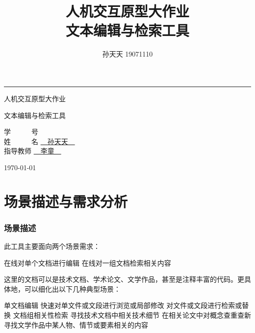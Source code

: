 \documentclass[scheme = chinese]{ctexart}
\begin{document}
\begin{titlepage}
    \centering
    \rule{\textwidth}{0pt}
    \vspace{0.25\textheight}
    
    { \heiti\sffamily 人机交互原型大作业}
    
    \vspace{0.05\textheight}
    
    { \heiti\sffamily 文本编辑与检索工具}
    
    \vspace{0.25\textheight}
    {
        \selectfont \songti
        学~~~~~~号 \underline{\qquad{}\;\qquad} \\
        姓~~~~~~名 \underline{\qquad~~孙天天~~\qquad} \\ 
        指导教师   \underline{\qquad~~李\quad 童~~\qquad} \\
    }
    \vspace{0.05\textheight}
    
    {\fontsize{10.5pt}{10.5pt}\selectfont \songti \today}
    
    \vfill
\end{titlepage}

\title{\huge 人机交互原型大作业\\
    \Large 文本编辑与检索工具}
\author{孙天天 19071110}

\tableofcontents
\clearpage

\maketitle

\part{场景描述与需求分析}

\section{场景描述}
此工具主要面向两个场景需求：
\begin{outline}
    \1 在线对单个文档进行编辑
    \1 在线对一组文档检索相关内容
\end{outline}

这里的文档可以是技术文档、学术论文、文学作品，甚至是注释丰富的代码。更具体地，可以细化出以下几种典型场景：
\begin{outline}
    \1 单文档编辑
        \2 快速对单文件或文段进行浏览或局部修改
        \2 对文件或文段进行检索或替换
    \1 文档组相关性检索
        \2 寻找技术文档中相关技术细节
        \2 在相关论文中对概念查重查新
        \2 寻找文学作品中某人物、情节或要素相关的内容
\end{outline}
\end{document}
